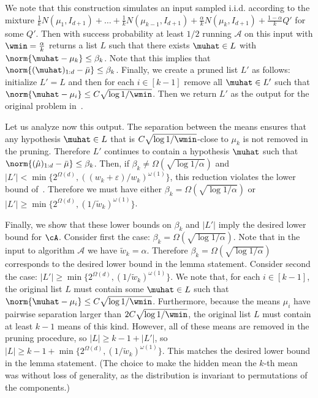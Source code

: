 We note that this construction simulates an input sampled i.i.d. according to the mixture $\frac{1}{k} N(\mu_1, I_{d+1}) + \ldots + \frac{1}{k} N(\mu_{k-1}, I_{d+1}) + \frac{\alpha}{k} N(\mu_k, I_{d+1}) + \frac{1-\alpha}{k} Q'$ for some $Q'$.
Then with success probability at least $1/2$ running $\mathcal{A}$ on this input with $\wmin = \frac{\alpha}{k}$ returns a list $L$ such that there exists $\muhat \in L$ with $\norm{\muhat - \mu_k} \leq \beta_k$.
Note that this implies that $\norm{(\muhat)_{1:d} - \bar\mu} \leq \beta_k$.
Finally, we create a pruned list $L'$ as follows: initialize $L' = L$ and then for each $i \in [k - 1]$ remove all $\muhat \in L'$ such that $\norm{\muhat - \mu_i} \leq C\sqrt{\log 1/\wmin}$.
Then we return $L'$ as the output for the original problem in~.

Let us analyze now this output.
The separation between the means ensures that any hypothesis $\muhat \in L$ that is $C\sqrt{\log1/\wmin}$-close to $\mu_k$ is not removed in the pruning. 
Therefore $L'$ continues to contain a hypothesis $\muhat$ such that $\norm{(\hat\mu)_{1:d} - \bar\mu} \leq \beta_k$.
Then, if $\beta_k \neq \Omega(\sqrt{\log 1/\alpha})$ and $|L'| < \min\{2^{\Omega(d)}, \left((w_k+\varepsilon) / w_k\right)^{\omega(1)}\}$, this reduction violates the lower bound of~.
Therefore we must have either $\beta_k = \Omega(\sqrt{\log 1/\alpha})$ or $|L'| \geq \min\{2^{\Omega(d)}, \left(1/\tilde{w}_k\right)^{\omega(1)}\}$.

Finally, we show that these lower bounds on $\beta_k$ and $|L'|$ imply the desired lower bound for $\cA$. 
Consider first the case: $\beta_k = \Omega(\sqrt{\log 1/\alpha})$.
Note that in the input to algorithm $\mathcal{A}$ we have $\tilde{w}_k = \alpha$.
Therefore $\beta_k = \Omega(\sqrt{\log 1/\alpha})$ corresponds to the desired lower bound in the lemma statement.
Consider second the case: $|L'| \geq \min\{2^{\Omega(d)}, \left(1/\tilde{w}_k\right)^{\omega(1)}\}$.
We note that, for each $i \in [k - 1]$, the original list $L$ must contain some $\muhat \in L$ such that $\norm{\muhat - \mu_i} \leq C\sqrt{\log1/\wmin}$.
Furthermore, because the means $\mu_i$ have pairwise separation larger than $2C\sqrt{\log1/\wmin}$, the original list $L$ must contain at least $k-1$ means of this kind.
However, all of these means are removed in the pruning procedure, so $|L| \geq k-1+|L'|$, so $|L| \geq k - 1 + \min\{2^{\Omega(d)}, \left(1/\tilde{w}_k\right)^{\omega(1)}\}$.
This matches the desired lower bound in the lemma statement.
(The choice to make the hidden mean the $k$-th mean was without loss of generality, as the distribution is invariant to permutations of the components.)

